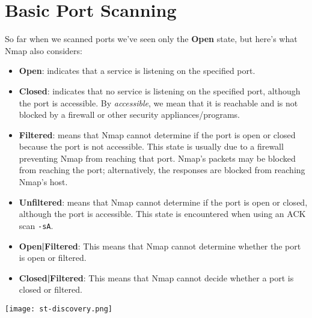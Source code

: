 \documentclass[11pt]{article}
\begin{document}
\setcounter{section}{3}
\setcounter{page}{13}  %

\renewcommand{\thesubsubsection}{\thesubsection.\Roman{subsubsection}}

\section{Basic Port Scanning}

\begin{tcolorbox}[colback=codebackground, colframe=warningcolor]
  So far when we scanned ports we've seen only the \textbf{Open}
  state, but here's what Nmap also considers:

  \begin{itemize}[leftmargin=*]
    \item \textbf{Open}: indicates that a service is listening on the
      specified port.
    \item \textbf{Closed}: indicates that no service is listening on
      the specified port, although the port is accessible. By
      \textit{accessible}, we mean that it is reachable and is not
      blocked by a firewall or other security appliances/programs.
    \item \textbf{Filtered}: means that Nmap cannot determine if the
      port is open or closed because the port is not accessible. This
      state is usually due to a firewall preventing Nmap from
      reaching that port. Nmap's packets may be blocked from reaching
      the port; alternatively, the responses are blocked from
      reaching Nmap's host.
    \item \textbf{Unfiltered}: means that Nmap cannot determine if
      the port is open or closed, although the port is accessible.
      This state is encountered when using an ACK scan \texttt{-sA}.
    \item \textbf{Open|Filtered}: This means that Nmap cannot
      determine whether the port is open or filtered.
    \item \textbf{Closed|Filtered}: This means that Nmap cannot
      decide whether a port is closed or filtered.
  \end{itemize}
\end{tcolorbox}

\begin{center}
  \texttt{[image: st-discovery.png]}
  \label{fig:sT-scan}
\end{center}
\end{document}
